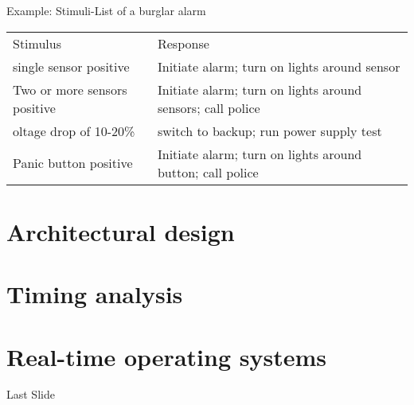 \documentclass[ngerman={babel}, utf8, bigger, xcolor={table,dvipsnames}, ompress, hyperref={bookmarks,colorlinks}]{beamer}
\begin{document}
\begin{frame}{Example: Stimuli-List of a burglar alarm}
	\begin{tabular}{p{9em}p{13em}}
		\rowcolor{blue!70}\hline Stimulus & Response \\ \pause
		single sensor positive & \pause Initiate alarm; turn on lights around sensor \\ \pause
		Two or more sensors positive & \pause Initiate alarm; turn on lights around sensors; call police \\ \pause
		oltage drop of 10-20\% & \pause switch to backup; run power supply test \\ \pause
		Panic button positive & \pause Initiate alarm; turn on lights around button; call police \\
	\end{tabular} \pause
\end{frame}

\section{Architectural design}

\section{Timing analysis}

\section{Real-time operating systems}


\begin{frame}{Last Slide}
	\vspace*{4em}{\huge Last Slide}
\end{frame}

\end{document}
